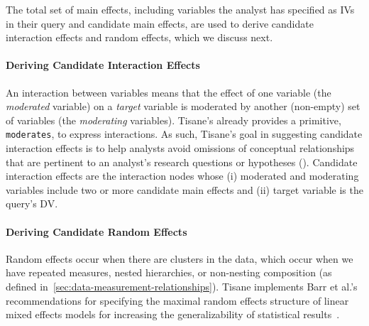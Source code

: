 The total set of main effects, including variables the analyst has specified as
IVs in their query and candidate main effects, are used to derive candidate interaction
effects and random effects, which we discuss next.

\paragraph{Deriving Candidate Interaction Effects}
An interaction between variables means that the effect of one variable (the \textit{moderated} variable) on a \textit{target} variable is moderated by another (non-empty) set of variables (the \textit{moderating} variables). Tisane's
\SDSL already provides a primitive, \texttt{moderates}, to
express interactions. As such, Tisane's goal in suggesting candidate interaction
effects is to help analysts avoid omissions of conceptual relationships
that are pertinent to an analyst's research questions or hypotheses (\dcConceptualKnowledge).
Candidate interaction effects are the interaction nodes whose (i) moderated and moderating variables include two or more candidate main effects and (ii)
    target variable is the query's DV.

\paragraph{Deriving Candidate Random Effects} \label{sec:deriveRandomEffects}
Random effects occur when there are clusters in the data, which occur when
we have repeated measures,
nested hierarchies, or non-nesting composition (as defined in~\autoref{sec:data-measurement-relationships}). Tisane implements Barr et al.'s recommendations
for specifying the maximal random effects structure of linear mixed effects
models for increasing the generalizability of statistical
results~\cite{barr2013random, barr2013randomUpdated}.

